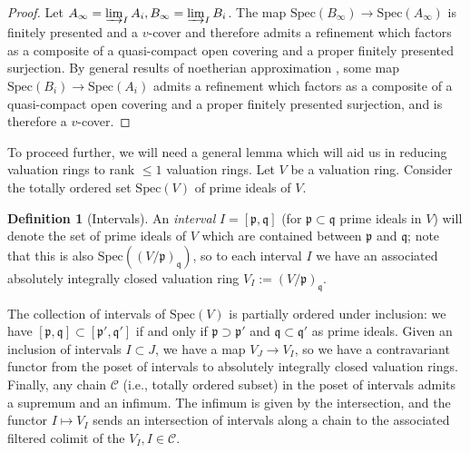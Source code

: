 \documentclass[reqno]{amsart}
\newcommand{\spec}{\mathrm{Spec}}
\theoremstyle{definition}
\newtheorem{definition}[theorem]{Definition}
\begin{document}
\begin{proof} 
Let $A_\infty = \varinjlim_I A_i, B_\infty = \varinjlim_I B_i$. The map
$\spec(B_\infty) \to \spec(A_\infty)$ is finitely presented and
a $v$-cover and therefore \cite[Theorem 3.12]{Rydh} admits a refinement which factors as a composite of a quasi-compact open
covering and a proper finitely presented surjection. By general results of
noetherian approximation \cite[Tag 09MV]{stacks-project}, some map $\spec(B_i)
\to \spec(A_i)$ admits a refinement which factors as a composite of a quasi-compact open covering and a
proper finitely presented surjection, and is therefore a $v$-cover.  
\end{proof} 

To proceed further, we will need a general lemma which will aid us in reducing 
valuation rings to rank $\leq 1$ valuation rings. 
Let $V$ be a valuation ring. 
Consider the totally ordered set $\spec(V)$ of prime ideals of $V$. 

\begin{definition}[Intervals] 
An \emph{interval} $I = [\mathfrak{p}, \mathfrak{q}]$ (for $\mathfrak{p}
\subset \mathfrak{q}$ prime ideals in $V$) will denote the set of
prime ideals of $V$ which 
are contained between $\mathfrak{p}$ and $\mathfrak{q}$; note that this is also
$\spec( (V/\mathfrak{p})_{\mathfrak{q}})$, so to each interval $I$ we have an
associated absolutely integrally closed valuation ring $V_I  :=
(V/\mathfrak{p})_{\mathfrak{q}}$.  

The collection of intervals of $\spec(V)$ is partially ordered under inclusion:
we have $[\mathfrak{p}, \mathfrak{q}] \subset [ \mathfrak{p}', \mathfrak{q}']$
if and only if $\mathfrak{p} \supset \mathfrak{p}'$ and $\mathfrak{q} \subset
\mathfrak{q}'$ as prime ideals.
Given an inclusion of intervals $I \subset J$, we have a 
map $V_J \to V_I$, so we have a contravariant functor from the poset of intervals
to absolutely integrally closed valuation rings. 
Finally, any chain $\mathcal{C}$ (i.e., totally ordered subset) in the
poset of intervals admits a supremum and an infimum. 
The infimum is 
given by the intersection, and the functor $I \mapsto V_I$ sends an
intersection of  intervals along a chain to the associated filtered colimit
of the $V_I, I \in \mathcal{C}$. 
\end{definition} 
\end{document}
